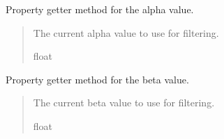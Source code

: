 \documentclass[letterpaper,10pt,english]{sphinxmanual}
\begin{document}
\begin{fulllineitems}
\begin{fulllineitems}
\begin{quote}
\begin{description}
\end{description}\end{quote}

\end{fulllineitems}


\begin{fulllineitems}
\label{\detokenize{modules/fusion/altimeter:qnav.fusion.altimeter.AlphaBetaAltimeter.alpha}}
\pysigstartsignatures
{}
\pysigstopsignatures
\sphinxAtStartPar
Property getter method for the alpha value.
\begin{quote}\begin{description}
\sphinxAtStartPar
The current alpha value to use for filtering.

\sphinxAtStartPar
float

\end{description}\end{quote}

\end{fulllineitems}


\begin{fulllineitems}
\label{\detokenize{modules/fusion/altimeter:qnav.fusion.altimeter.AlphaBetaAltimeter.beta}}
\pysigstartsignatures
{}
\pysigstopsignatures
\sphinxAtStartPar
Property getter method for the beta value.
\begin{quote}\begin{description}
\sphinxAtStartPar
The current beta value to use for filtering.

\sphinxAtStartPar
float

\end{description}\end{quote}

\end{fulllineitems}


\end{fulllineitems}
\end{document}
